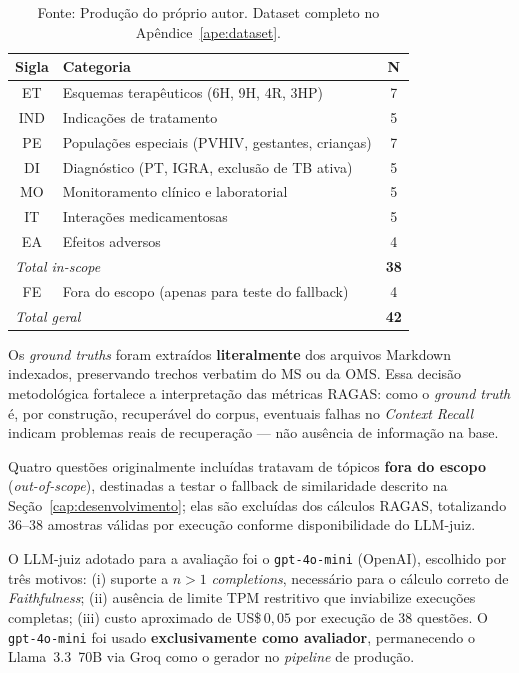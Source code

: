 \documentclass[
  12pt,
  oneside,
  a4paper,
  english,
  brazil
]{abntex2}
\begin{document}
\begin{table}[h]
  \centering
  \caption{Distribuição do \textit{dataset} de avaliação por categoria}
  \label{tab:dataset-cat}
  \begin{tabular}{@{}clc@{}}
  \toprule
  \textbf{Sigla} & \textbf{Categoria} & \textbf{N} \\
  \midrule
  ET   & Esquemas terapêuticos (6H, 9H, 4R, 3HP)            & 7 \\
  IND  & Indicações de tratamento                            & 5 \\
  PE   & Populações especiais (PVHIV, gestantes, crianças)   & 7 \\
  DI   & Diagnóstico (PT, IGRA, exclusão de TB ativa)        & 5 \\
  MO   & Monitoramento clínico e laboratorial                & 5 \\
  IT   & Interações medicamentosas                           & 5 \\
  EA   & Efeitos adversos                                    & 4 \\
  \midrule
  \multicolumn{2}{l}{\textit{Total \textit{in-scope}}}        & \textbf{38} \\
  FE   & Fora do escopo (apenas para teste do fallback) & 4 \\
  \midrule
  \multicolumn{2}{l}{\textit{Total geral}}                     & \textbf{42} \\
  \bottomrule
  \end{tabular}
  \caption*{Fonte: Produção do próprio autor. Dataset completo no
            Apêndice~\ref{ape:dataset}.}
\end{table}

Os \textit{ground truths} foram extraídos \textbf{literalmente} dos arquivos
Markdown indexados, preservando trechos verbatim do MS ou da OMS. Essa decisão
metodológica fortalece a interpretação das métricas RAGAS: como o \textit{ground
truth} é, por construção, recuperável do corpus, eventuais falhas no
\textit{Context Recall} indicam problemas reais de recuperação --- não ausência
de informação na base.

Quatro questões originalmente incluídas tratavam de tópicos \textbf{fora do
escopo} (\textit{out-of-scope}), destinadas a testar o fallback de
similaridade descrito na Seção~\ref{cap:desenvolvimento}; elas são excluídas dos
cálculos RAGAS, totalizando $36$--$38$ amostras válidas por execução conforme
disponibilidade do LLM-juiz.

O LLM-juiz adotado para a avaliação foi o \texttt{gpt-4o-mini} (OpenAI),
escolhido por três motivos: (i) suporte a $n>1$ \textit{completions}, necessário
para o cálculo correto de \textit{Faithfulness}; (ii) ausência de limite TPM
restritivo que inviabilize execuções completas; (iii) custo aproximado de
US\$\,$0{,}05$ por execução de 38 questões. O \texttt{gpt-4o-mini} foi
usado \textbf{exclusivamente como avaliador}, permanecendo o
Llama~3.3~70B via Groq como o gerador no \textit{pipeline} de produção.
\end{document}
